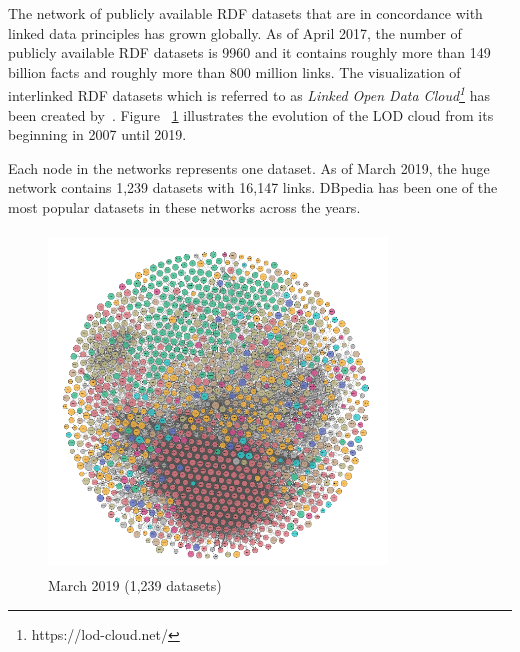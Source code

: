The network of publicly available RDF datasets that are in concordance with linked data principles has grown globally. As of April 2017, the number of publicly available RDF datasets is 9960 and it contains roughly more than 149 billion facts and roughly more than 800 million links. The visualization of interlinked RDF datasets which is referred to as \textit{Linked Open Data Cloud\footnote{https://lod-cloud.net/}} has been  created by~\cite{LOD_cloud}.  Figure ~\ref{fig:lod_cloud} illustrates the evolution of the LOD cloud from its beginning in 2007 until 2019.  

Each node in the networks represents one dataset. As of March 2019, the huge network contains 1,239 datasets with 16,147 links. DBpedia has been one of the most popular datasets in these networks across the years. 
\newpage

\vspace{10cm}

%
\clearpage

\begin{figure}[t!]
\centering
\captionsetup{justification=centering,margin=2cm}
 \includegraphics[height=9cm,width=9cm]{Figures/LOD/fig_LOD_2019_clean.png}
 \caption{March 2019 (1,239 datasets)}
 \label{fig:lod_cloud}
\end{figure}


